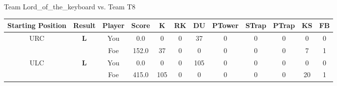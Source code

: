 \documentclass[a4paper,12pt]{article}
\begin{document}
  \vspace*{2em}
  \par {\large {\color{Gray} Team} Lord\_of\_the\_keyboard {\color{Gray}
      vs. Team} T8}
  \newline
  \begin{tabular}[t]{| c | c | c | c | c | c | c | c | c | c | c | c
      |}
    \hline
    Starting Position & \textbf{Result} & Player & \textbf{Score} & K & RK & DU & PTower & STrap & PTrap & KS & FB \\
    
      
                      
      
                      
      
        \hline
        \multirow{2}{*}{  URC
             } &
              \multirow{2}{*}{  \textbf{L}  } & 
                    \cellcolor{yellow!25} You & \cellcolor{yellow!25} 0.0 & \cellcolor{yellow!25} 0 &
                    \cellcolor{yellow!25} 0 & \cellcolor{yellow!25} 37 & \cellcolor{yellow!25} 0 &
                    \cellcolor{yellow!25} 0 & \cellcolor{yellow!25} 0 & \cellcolor{yellow!25} 0 &
                    \cellcolor{yellow!25} 0 \\
                    \cline{3-12}
                    & & \cellcolor{red!15} Foe & \cellcolor{red!15} 152.0 & \cellcolor{red!15} 37 & \cellcolor{red!15}
                    0 & \cellcolor{red!15} 0
                    & \cellcolor{red!15} 0 & \cellcolor{red!15}
                    0 & \cellcolor{red!15} 0 
                    & \cellcolor{red!15} 7 & \cellcolor{red!15}
                    1 \\
                    
                      
      
                      
      
                      
      
                      
      
                      
      
                      
      
                      
      
        \hline
        \multirow{2}{*}{  ULC  } &
              \multirow{2}{*}{  \textbf{L}  } & 
                    \cellcolor{yellow!25} You & \cellcolor{yellow!25} 0.0 & \cellcolor{yellow!25} 0 &
                    \cellcolor{yellow!25} 0 & \cellcolor{yellow!25} 105 & \cellcolor{yellow!25} 0 &
                    \cellcolor{yellow!25} 0 & \cellcolor{yellow!25} 0 & \cellcolor{yellow!25} 0 &
                    \cellcolor{yellow!25} 0 \\
                    \cline{3-12}
                    & & \cellcolor{red!15} Foe & \cellcolor{red!15} 415.0 & \cellcolor{red!15} 105 & \cellcolor{red!15}
                    0 & \cellcolor{red!15} 0
                    & \cellcolor{red!15} 0 & \cellcolor{red!15}
                    0 & \cellcolor{red!15} 0 
                    & \cellcolor{red!15} 20 & \cellcolor{red!15}
                    1 \\
                    

\end{tabular}
\end{document}
